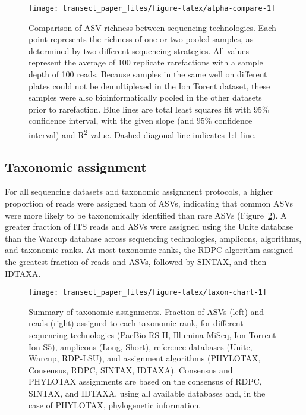 \documentclass[
  12pt,
]{article}
\begin{document}
\begin{figure}

{\centering \texttt{[image: transect\_paper\_files/figure-latex/alpha-compare-1]} 

}

\caption[Comparison of ASV richness between sequencing technologies]{Comparison of ASV richness between sequencing technologies. Each point represents the richness of one or two pooled samples, as determined by two different sequencing strategies. All values represent the average of 100 replicate rarefactions with a sample depth of 100 reads. Because samples in the same well on different plates could not be demultiplexed in the Ion Torent dataset, these samples were also bioinformatically pooled in the other datasets prior to rarefaction. Blue lines are total least squares fit with 95\% confidence interval, with the given slope (and 95\% confidence interval) and R\textsuperscript{2} value. Dashed diagonal line indicates 1:1 line.}\label{fig:alpha-compare}
\end{figure}

\hypertarget{taxonomic-assignment}{%
\subsection{Taxonomic assignment}\label{taxonomic-assignment}}

For all sequencing datasets and taxonomic assignment protocols, a higher proportion of reads were assigned than of ASVs, indicating that common ASVs were more likely to be taxonomically identified than rare ASVs (Figure~\ref{fig:taxon-chart}).
A greater fraction of ITS reads and ASVs were assigned using the Unite database than the Warcup database across sequencing technologies, amplicons, algorithms, and taxonomic ranks.
At most taxonomic ranks, the RDPC algorithm assigned the greatest fraction of reads and ASVs, followed by SINTAX, and then IDTAXA.






\begin{figure}

{\centering \texttt{[image: transect\_paper\_files/figure-latex/taxon-chart-1]} 

}

\caption[Summary of taxonomic assignments]{Summary of taxonomic assignments. Fraction of ASVs (left) and reads (right) assigned to each taxonomic rank, for different sequencing technologies (PacBio RS II, Illumina MiSeq, Ion Torrent Ion S5), amplicons (Long, Short), reference databases (Unite, Warcup, RDP-LSU), and assignment algorithms (PHYLOTAX, Consensus, RDPC, SINTAX, IDTAXA).
Consensus and PHYLOTAX assignments are based on the consensus of RDPC, SINTAX, and IDTAXA, using all available databases and, in the case of PHYLOTAX, phylogenetic information.}\label{fig:taxon-chart}
\end{figure}
\end{document}
